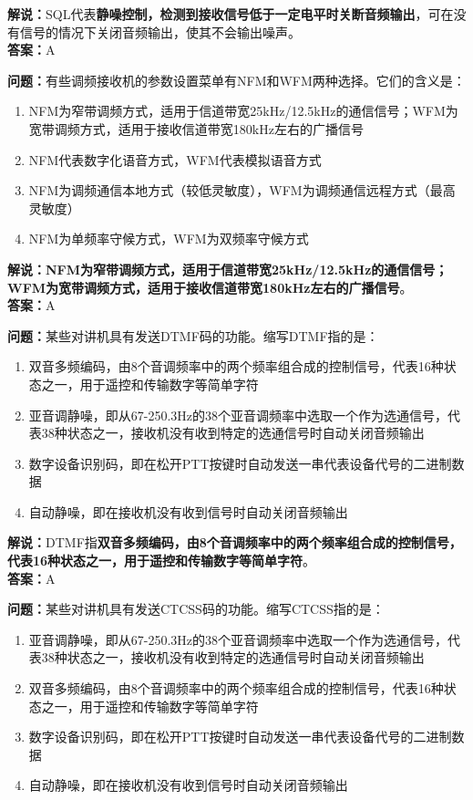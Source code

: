 \textbf{解说：}SQL代表\textbf{静噪控制，检测到接收信号低于一定电平时关断音频输出}，可在没有信号的情况下关闭音频输出，使其不会输出噪声。\\\textbf{答案：}A%



\textbf{问题：}有些调频接收机的参数设置菜单有NFM和WFM两种选择。它们的含义是：

\begin{enumerate}[label=\Alph*), leftmargin=1cm]
	\item NFM为窄带调频方式，适用于信道带宽25kHz/12.5kHz的通信信号；WFM为宽带调频方式，适用于接收信道带宽180kHz左右的广播信号
	\item NFM代表数字化语音方式，WFM代表模拟语音方式
	\item NFM为调频通信本地方式（较低灵敏度），WFM为调频通信远程方式（最高灵敏度）
	\item NFM为单频率守候方式，WFM为双频率守候方式
\end{enumerate}

\textbf{解说：NFM为窄带调频方式，适用于信道带宽25kHz/12.5kHz的通信信号；WFM为宽带调频方式，适用于接收信道带宽180kHz左右的广播信号}。\\\textbf{答案：}A%



\textbf{问题：}某些对讲机具有发送DTMF码的功能。缩写DTMF指的是：

\begin{enumerate}[label=\Alph*), leftmargin=1cm]
	\item 双音多频编码，由8个音调频率中的两个频率组合成的控制信号，代表16种状态之一，用于遥控和传输数字等简单字符
	\item 亚音调静噪，即从67-250.3Hz的38个亚音调频率中选取一个作为选通信号，代表38种状态之一，接收机没有收到特定的选通信号时自动关闭音频输出
	\item 数字设备识别码，即在松开PTT按键时自动发送一串代表设备代号的二进制数据
	\item 自动静噪，即在接收机没有收到信号时自动关闭音频输出
\end{enumerate}

\textbf{解说：}DTMF指\textbf{双音多频编码，由8个音调频率中的两个频率组合成的控制信号，代表16种状态之一，用于遥控和传输数字等简单字符}。\\\textbf{答案：}A%



\textbf{问题：}某些对讲机具有发送CTCSS码的功能。缩写CTCSS指的是：

\begin{enumerate}[label=\Alph*), leftmargin=1cm]
	\item 亚音调静噪，即从67-250.3Hz的38个亚音调频率中选取一个作为选通信号，代表38种状态之一，接收机没有收到特定的选通信号时自动关闭音频输出
	\item 双音多频编码，由8个音调频率中的两个频率组合成的控制信号，代表16种状态之一，用于遥控和传输数字等简单字符
	\item 数字设备识别码，即在松开PTT按键时自动发送一串代表设备代号的二进制数据
	\item 自动静噪，即在接收机没有收到信号时自动关闭音频输出
\end{enumerate}

